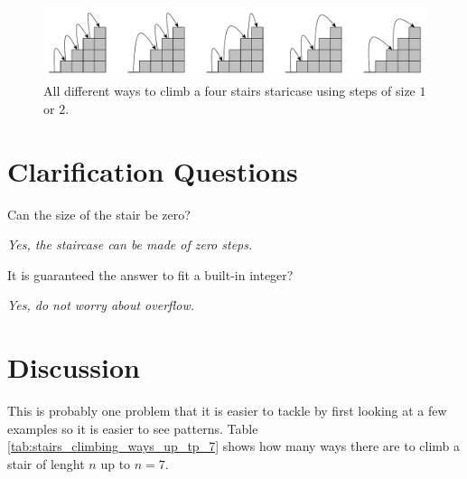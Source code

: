 \begin{figure}
	\centering
	\includegraphics[width=\textwidth]{sources/stairs_climbing/images/stairs4}
	\caption{All different ways to climb a four stairs staricase using steps of size $1$ or $2$.}
	\label{fig:stair_example_5}
\end{figure}

\section{Clarification Questions}

\begin{QandA}
	\item \begin{questionitem} \begin{question} Can the size of the stair be zero?  \end{question} 	 
    \begin{answered}
		\textit{Yes, the staircase can be made of zero steps.}
	\end{answered} \end{questionitem}
	
	\item \begin{questionitem} \begin{question} It is guaranteed the answer to fit a built-in integer?  \end{question} 	 
    \begin{answered}
		\textit{Yes, do not worry about overflow.}
	\end{answered} \end{questionitem}

\end{QandA}

\section{Discussion}
\label{stairs_climbing:sec:discussion}

This is probably one problem that it is easier to tackle by first looking at a few examples so it is easier to see patterns. Table \ref{tab:stairs_climbing_ways_up_tp_7} shows  how many ways there are to climb a stair of lenght $n$ up to $n=7$.

